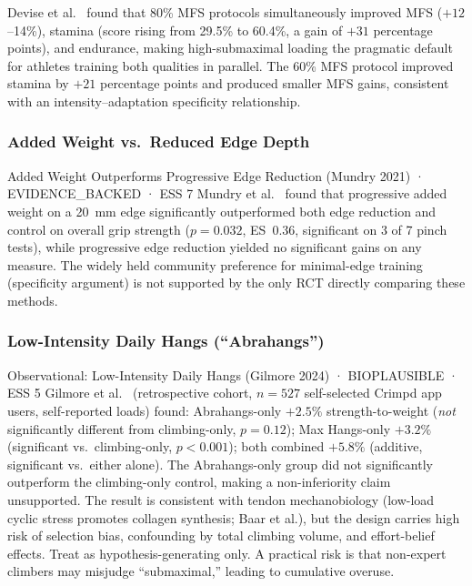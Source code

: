 Devise et al.\ \cite{DO22} found that 80\% MFS protocols simultaneously improved MFS ($+12$--14\%), stamina (score rising from 29.5\% to 60.4\%, a gain of $+31$ percentage points), and endurance, making high-submaximal loading the pragmatic default for athletes training both qualities in parallel. The 60\% MFS protocol improved stamina by $+21$ percentage points and produced smaller MFS gains, consistent with an intensity--adaptation specificity relationship.

\subsubsection{Added Weight vs.\ Reduced Edge Depth}

\begin{evidencebox}{Added Weight Outperforms Progressive Edge Reduction (Mundry 2021) · EVIDENCE\_BACKED · ESS 7}
Mundry et al.\ \cite{MSAE21} found that progressive added weight on a 20~mm edge significantly outperformed both edge reduction and control on overall grip strength ($p=0.032$, ES~$0.36$, significant on 3 of 7 pinch tests), while progressive edge reduction yielded no significant gains on any measure. The widely held community preference for minimal-edge training (specificity argument) is not supported by the only RCT directly comparing these methods.
\end{evidencebox}

\subsubsection{Low-Intensity Daily Hangs (``Abrahangs'')}

\begin{bioplausbox}{Observational: Low-Intensity Daily Hangs (Gilmore 2024) · BIOPLAUSIBLE · ESS 5}
Gilmore et al.\ \cite{GKAO24} (retrospective cohort, $n = 527$ self-selected Crimpd app users, self-reported loads) found: Abrahangs-only $+2.5\%$ strength-to-weight (\textit{not} significantly different from climbing-only, $p = 0.12$); Max Hangs-only $+3.2\%$ (significant vs.\ climbing-only, $p < 0.001$); both combined $+5.8\%$ (additive, significant vs.\ either alone). The Abrahangs-only group did not significantly outperform the climbing-only control, making a non-inferiority claim unsupported. The result is consistent with tendon mechanobiology (low-load cyclic stress promotes collagen synthesis; Baar et al.), but the design carries high risk of selection bias, confounding by total climbing volume, and effort-belief effects. Treat as hypothesis-generating only. A practical risk is that non-expert climbers may misjudge ``submaximal,'' leading to cumulative overuse.
\end{bioplausbox}

